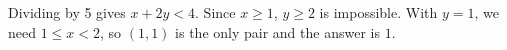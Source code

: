 Dividing by 5 gives $ x+2y<4 $. Since $ x\ge1 $, $ y\ge2 $ is impossible. With $ y=1 $, we need $ 1\le x<2 $, so $(1,1)$ is the only pair and the answer is $\boxed1 $.
